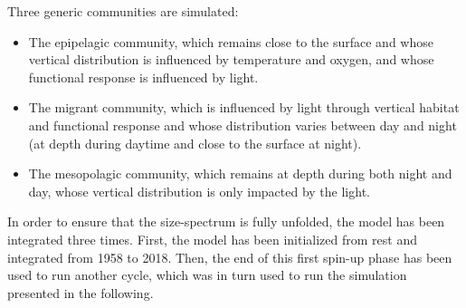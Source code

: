 %
%

Three generic communities are simulated:
\begin{itemize}
\item{The epipelagic community, which remains close to the surface and whose vertical distribution is influenced by temperature and oxygen, and whose functional response is influenced by light.}
\item{The migrant community, which is influenced by light through vertical habitat and functional response and whose distribution varies between day and night (at depth during daytime and close to the surface at night).}
\item{The  mesopolagic community, which remains at depth during both night and day, whose vertical distribution is only impacted by the light.}
\end{itemize}


In order to ensure that the size-spectrum is fully unfolded, the model has been integrated three times. First, the model has been initialized from rest and integrated from 1958 to 2018. Then, the end of this first spin-up phase has been used to run another cycle, which was in turn used to run the simulation presented in the following.

